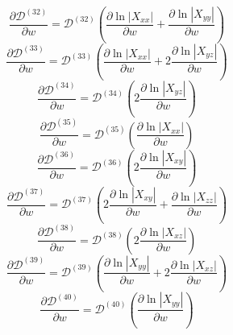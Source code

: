 \documentclass[a4paper,12pt]{article}%
\begin{document}
\begin{equation}
\frac{\partial\mathcal{D}^{\left(  32\right)  }}{\partial w}=\mathcal{D}%
^{\left(  32\right)  }\left(  \frac{\partial\ln\left\vert X_{xx}\right\vert
}{\partial w}+\frac{\partial\ln\left\vert X_{yy}\right\vert }{\partial
w}\right)
\end{equation}%
\begin{equation}
\frac{\partial\mathcal{D}^{\left(  33\right)  }}{\partial w}=\mathcal{D}%
^{\left(  33\right)  }\left(  \frac{\partial\ln\left\vert X_{xx}\right\vert
}{\partial w}+2\frac{\partial\ln\left\vert X_{yz}\right\vert }{\partial
w}\right)
\end{equation}%
\begin{equation}
\frac{\partial\mathcal{D}^{\left(  34\right)  }}{\partial w}=\mathcal{D}%
^{\left(  34\right)  }\left(  2\frac{\partial\ln\left\vert X_{yz}\right\vert
}{\partial w}\right)
\end{equation}%
\begin{equation}
\frac{\partial\mathcal{D}^{\left(  35\right)  }}{\partial w}=\mathcal{D}%
^{\left(  35\right)  }\left(  \frac{\partial\ln\left\vert X_{xx}\right\vert
}{\partial w}\right)
\end{equation}%
\begin{equation}
\frac{\partial\mathcal{D}^{\left(  36\right)  }}{\partial w}=\mathcal{D}%
^{\left(  36\right)  }\left(  2\frac{\partial\ln\left\vert X_{xy}\right\vert
}{\partial w}\right)
\end{equation}%
\begin{equation}
\frac{\partial\mathcal{D}^{\left(  37\right)  }}{\partial w}=\mathcal{D}%
^{\left(  37\right)  }\left(  2\frac{\partial\ln\left\vert X_{xy}\right\vert
}{\partial w}+\frac{\partial\ln\left\vert X_{zz}\right\vert }{\partial
w}\right)
\end{equation}%
\begin{equation}
\frac{\partial\mathcal{D}^{\left(  38\right)  }}{\partial w}=\mathcal{D}%
^{\left(  38\right)  }\left(  2\frac{\partial\ln\left\vert X_{xz}\right\vert
}{\partial w}\right)
\end{equation}%
\begin{equation}
\frac{\partial\mathcal{D}^{\left(  39\right)  }}{\partial w}=\mathcal{D}%
^{\left(  39\right)  }\left(  \frac{\partial\ln\left\vert X_{yy}\right\vert
}{\partial w}+2\frac{\partial\ln\left\vert X_{xz}\right\vert }{\partial
w}\right)
\end{equation}%
\begin{equation}
\frac{\partial\mathcal{D}^{\left(  40\right)  }}{\partial w}=\mathcal{D}%
^{\left(  40\right)  }\left(  \frac{\partial\ln\left\vert X_{yy}\right\vert
}{\partial w}\right)
\end{equation}%
\end{document}
